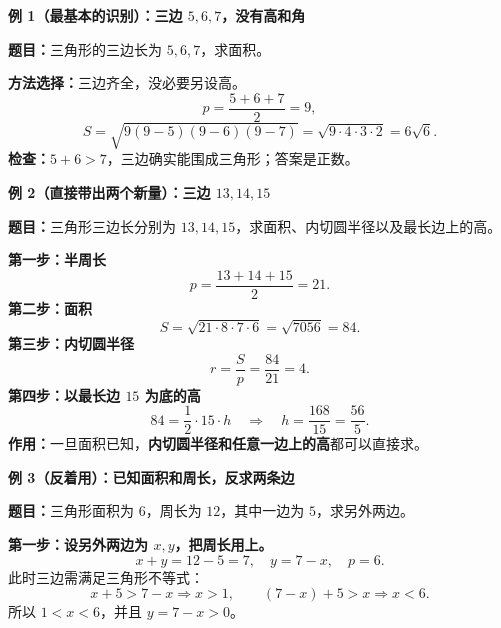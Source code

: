\begin{examplebox}
\par\noindent\begin{minipage}{\linewidth}
  \textbf{\textcolor{CExample}{例 1（最基本的识别）：三边 $5,6,7$，没有高和角}}

  \textbf{题目：}三角形的三边长为 $5,6,7$，求面积。

\end{minipage}\par
  \textbf{方法选择：}三边齐全，没必要另设高。
  \[
   p=\frac{5+6+7}{2}=9,
  \]
  \[
   S=\sqrt{9(9-5)(9-6)(9-7)}
     =\sqrt{9\cdot4\cdot3\cdot2}=\boxed{6\sqrt6}.
  \]
  \textbf{检查：}$5+6>7$，三边确实能围成三角形；答案是正数。

  \medskip
\par\noindent\begin{minipage}{\linewidth}
  \textbf{\textcolor{CExample}{例 2（直接带出两个新量）：三边 $13,14,15$}}

  \textbf{题目：}三角形三边长分别为 $13,14,15$，求面积、内切圆半径以及最长边上的高。

\end{minipage}\par
  \textbf{第一步：半周长}
  \[
   p=\frac{13+14+15}{2}=21.
  \]
  \textbf{第二步：面积}
  \[
   S=\sqrt{21\cdot8\cdot7\cdot6}=\sqrt{7056}=\boxed{84}.
  \]
  \textbf{第三步：内切圆半径}
  \[
   r=\frac Sp=\frac{84}{21}=\boxed4.
  \]
  \textbf{第四步：以最长边 $15$ 为底的高}
  \[
   84=\frac12\cdot15\cdot h
   \quad\Longrightarrow\quad h=\frac{168}{15}=\boxed{\frac{56}{5}}.
  \]
  \textbf{作用：}一旦面积已知，\textbf{内切圆半径和任意一边上的高}都可以直接求。

  \medskip
\par\noindent\begin{minipage}{\linewidth}
  \textbf{\textcolor{CExample}{例 3（反着用）：已知面积和周长，反求两条边}}

  \textbf{题目：}三角形面积为 $6$，周长为 $12$，其中一边为 $5$，求另外两边。

\end{minipage}\par
  \textbf{第一步：设另外两边为 $x,y$，把周长用上。}
  \[
    x+y=12-5=7,\quad y=7-x,\quad p=6.
  \]
  此时三边需满足三角形不等式：
  \[
    x+5>7-x\Longrightarrow x>1,\qquad
    (7-x)+5>x\Longrightarrow x<6.
  \]
  所以 $1<x<6$，并且 $y=7-x>0$。


\end{examplebox}
